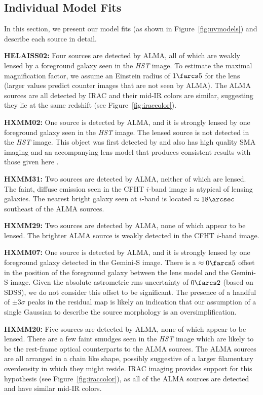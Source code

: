 \documentclass[iop]{emulateapj}
\begin{document}
\subsection{Individual Model Fits}\label{sec:objectbyobject}

In this section, we present our model fits (as shown in
Figure~\ref{fig:uvmodels}) and describe each source in detail.

{\bf HELAISS02:} Four sources are detected by ALMA, all of which are weakly
lensed by a foreground galaxy seen in the {\it HST} image.  To estimate the
maximal magnification factor, we assume an Einstein radius of $1\farcs5$ for
the lens (larger values predict counter images that are not seen by ALMA).  The
ALMA sources are all detected by IRAC and their mid-IR colors are similar,
suggesting they lie at the same redshift (see Figure~\ref{fig:iraccolor}).

{\bf HXMM02:} One source is detected by ALMA, and it is strongly lensed by one
foreground galaxy seen in the {\it HST} image.  The lensed source is not
detected in the {\it HST} image.  This object was first detected by
\citet{Ikarashi:2011qy} and also has high quality SMA imaging and an
accompanying lens model that produces consistent results with those given here
\citep{Bussmann:2013lr}.

{\bf HXMM31:} Two sources are detected by ALMA, neither of which are lensed.
The faint, diffuse emission seen in the CFHT $i$-band image is atypical of
lensing galaxies.  The nearest bright galaxy seen at $i$-band is located
$\approx 18\arcsec$ southeast of the ALMA sources.

{\bf HXMM29:} Two sources are detected by ALMA, none of which appear to be
lensed.  The brighter ALMA source is weakly detected in the CFHT $i$-band
image.  

{\bf HXMM07:} One source is detected by ALMA, and it is strongly lensed by one
foreground galaxy detected in the Gemini-S image.  There is a $\approx
0\farcs5$ offset in the position of the foreground galaxy between the lens
model and the Gemini-S image.  Given the absolute astrometric rms uncertainty
of $0\farcs2$ (based on SDSS), we do not consider this offset to be
significant.  The presence of a handful of $\pm3\sigma$ peaks in the residual
map is likely an indication that our assumption of a single Gaussian to
describe the source morphology is an oversimplification.

{\bf HXMM20:} Five sources are detected by ALMA, none of which appear to be
lensed.  There are a few faint smudges seen in the {\it HST} image which are
likely to be the rest-frame optical counterparts to the ALMA sources.  The ALMA
sources are all arranged in a chain like shape, possibly suggestive of a larger
filamentary overdensity in which they might reside.  IRAC imaging provides
support for this hypothesis (see Figure~\ref{fig:iraccolor}), as all of the ALMA
sources are detected and have similar mid-IR colors.
\end{document}
